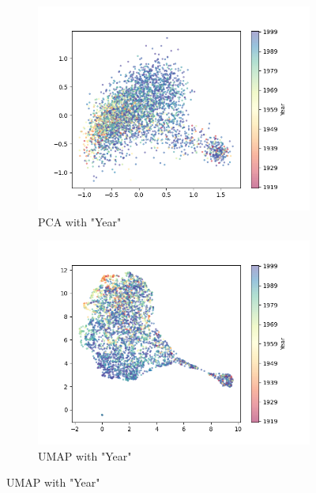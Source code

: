 \documentclass{article}
\begin{document}
\begin{figure}[H]
    \centering
    \begin{subfigure}{0.49\textwidth}
        \includegraphics[width=\textwidth]{fig/pca_year.png}
        \caption{PCA with "Year"}
    \end{subfigure}
    \begin{subfigure}{0.49\textwidth}
        \includegraphics[width=\textwidth]{fig/umap_year.png}
        \caption{UMAP with "Year"}
    \end{subfigure}


\end{figure}
\end{document}
